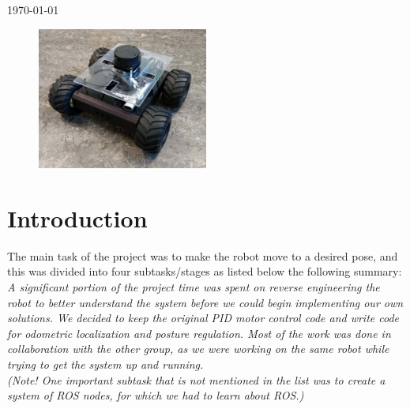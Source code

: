 \documentclass[a4paper,10pt]{article}
\begin{document}
\begin{titlepage}
	
	
	\vfill\vfill\vfill %
	
	{\large\today} %
	
	
	\begin{figure}[H]
	\centering
	 \includegraphics[width=0.5\textwidth]{rover_pic.png}
	\end{figure}
	 
	
	\vfill %
	
\end{titlepage}



\renewcommand{\labelenumi}{\alph{enumi})}


\section*{Introduction}


The main task of the project was to make the robot move to a desired pose, and this was divided into four subtasks/stages as listed below the following summary:\\  
\textit{A significant portion of the project time was spent on reverse engineering the robot to better understand the system before we could begin implementing our own solutions.  
We decided to keep the original PID motor control code and write code for odometric localization and posture regulation. 
Most of the work was done in collaboration with the other group, 
as we were working on the same robot while trying to get the system up and running. \\
(Note! One important subtask that is not mentioned in the list was to create a system of ROS nodes, for which we had to learn about ROS.)}
\end{document}
